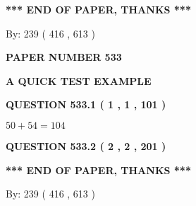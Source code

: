 \documentclass[12pt]{article}
\begin{document}
   
 \vspace{0.2in}
 
   
   
   
   
\vspace{1.0in} 
{\textbf{\large{ *** END OF PAPER, THANKS *** }}} 
   
   
\hspace{1.0in} By: 
 239 ( 416 ,  613 )
   
   
   
   
\newpage 
\setcounter{page}{ 
   533001 } 
   
   
   
   
 {\textbf{ \Large{ PAPER NUMBER  533  }}}
   
   
\vspace{0.2in}
   
   
   
   
   
   
 \vspace{0.2in}
{\LARGE {\textbf{ A QUICK TEST EXAMPLE}}}
   
   
  
\vspace{0.2in}
  
{\textbf{\Large{QUESTION
533.1 
 ( 1 , 1 , 101 )
}}}
  
  
 
 

$ %
50 +  %
54=   %
104$
 
 
  
\vspace{0.2in}
  
{\textbf{\Large{QUESTION
533.2 
 ( 2 , 2 , 201 )
}}}
  
  
   
   
 \vspace{0.2in}
 
   
   
   
   
\vspace{1.0in} 
{\textbf{\large{ *** END OF PAPER, THANKS *** }}} 
   
   
\hspace{1.0in} By: 
 239 ( 416 ,  613 )
   
   
   
   
\newpage 
\setcounter{page}{ 
   534001 } 
   
   
   
\end{document}
